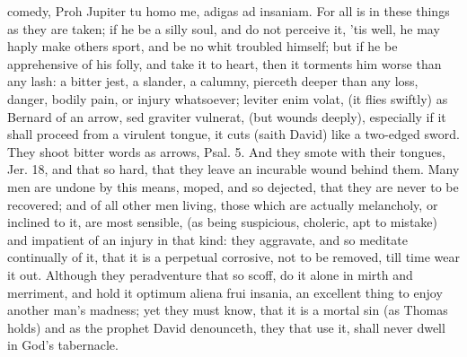 {comedy, Proh Jupiter tu homo me, adigas ad insaniam. For all is in
these things as they are taken; if he be a silly soul, and do not
perceive it, 'tis well, he may haply make others sport, and be no whit
troubled himself; but if he be apprehensive of his folly, and take it
to heart, then it torments him worse than any lash: a bitter jest, a
slander, a calumny, pierceth deeper than any loss, danger, bodily pain,
or injury whatsoever; leviter enim volat, (it flies swiftly) as Bernard
of an arrow, sed graviter vulnerat, (but wounds deeply), especially if
it shall proceed from a virulent tongue, it cuts (saith David) like a
two-edged sword. They shoot bitter words as arrows, Psal.  5. And
they smote with their tongues, Jer.  18, and that so hard, that
they leave an incurable wound behind them. Many men are undone by this
means, moped, and so dejected, that they are never to be recovered; and
of all other men living, those which are actually melancholy, or
inclined to it, are most sensible, (as being suspicious, choleric, apt
to mistake) and impatient of an injury in that kind: they aggravate,
and so meditate continually of it, that it is a perpetual corrosive,
not to be removed, till time wear it out. Although they peradventure
that so scoff, do it alone in mirth and merriment, and hold it optimum
aliena frui insania, an excellent thing to enjoy another man's madness;
yet they must know, that it is a mortal sin (as Thomas holds) and
as the prophet David denounceth, they that use it, shall never
dwell in God's tabernacle.

}

